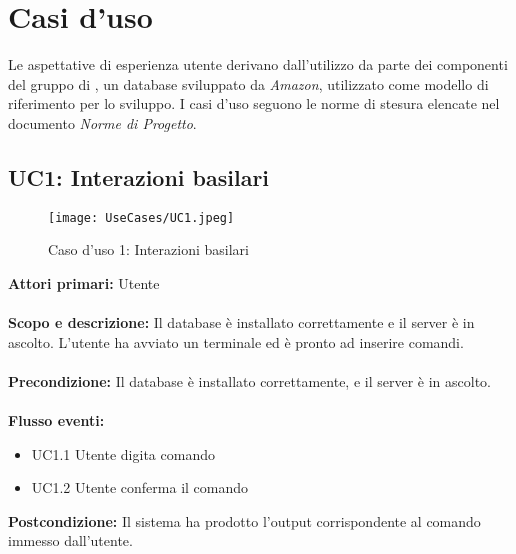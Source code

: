 \documentclass{scalatekids-article}
\begin{document}
\section{Casi d'uso}
Le aspettative di esperienza utente derivano dall'utilizzo da parte dei
componenti del gruppo di , un database 
sviluppato da \textit{Amazon}, utilizzato come modello di riferimento per lo
sviluppo. I casi d'uso seguono le norme di stesura elencate nel documento \textit{Norme di Progetto}.%
\subsection{UC1: Interazioni basilari}
\begin{figure}[H]
  \texttt{[image: UseCases/UC1.jpeg]}
  \caption{Caso d'uso 1: Interazioni basilari}
\end{figure}
\textbf{Attori primari:} Utente\\ \\
\textbf{Scopo e descrizione:} Il database è installato correttamente e il server è in ascolto.
L'utente ha avviato un terminale ed è pronto ad inserire comandi.\\ \\
\textbf{Precondizione:} Il database è installato correttamente, e il server è in ascolto.\\ \\
\textbf{Flusso eventi:}
\begin{itemize}
\item UC1.1 Utente digita comando
\item UC1.2 Utente conferma il comando
\end{itemize}
\textbf{Postcondizione:} Il sistema ha prodotto l'output corrispondente al comando immesso dall'utente.
\end{document}
